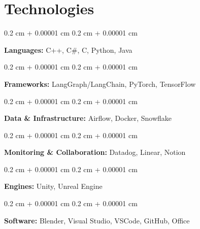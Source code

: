 \documentclass[10pt, letterpaper]{article}
\newenvironment{onecolentry}{
    \begin{adjustwidth}{
        0.2 cm + 0.00001 cm
    }{
        0.2 cm + 0.00001 cm
    }
}{
    \end{adjustwidth}
} %
\begin{document}
        
    
    \section{Technologies}



        
        \begin{onecolentry}
            \textbf{Languages:} C++, C\#, C, Python, Java
        \end{onecolentry}

        \vspace{0.2 cm}
        
        \begin{onecolentry}
            \textbf{Frameworks:} LangGraph/LangChain, PyTorch, TensorFlow 
        \end{onecolentry}

        \vspace{0.2 cm}

        \begin{onecolentry}
            \textbf{Data \& Infrastructure:} Airflow, Docker, Snowflake
        \end{onecolentry}

        \vspace{0.2 cm}

        \begin{onecolentry}
            \textbf{Monitoring \& Collaboration:} Datadog, Linear, Notion
        \end{onecolentry}
        
        \vspace{0.2 cm}

        \begin{onecolentry}
            \textbf{Engines:} Unity, Unreal Engine
        \end{onecolentry}

        \vspace{0.2 cm}
        
        \begin{onecolentry}
            \textbf{Software:}  Blender, Visual Studio, VSCode, GitHub, Office 
        \end{onecolentry}


    
\end{document}
